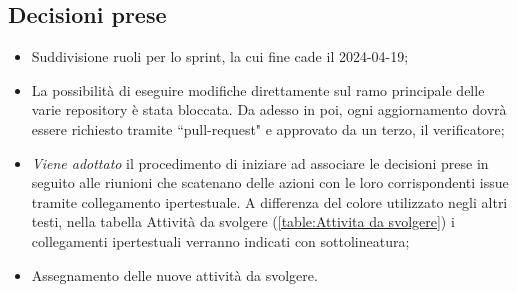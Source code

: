 \documentclass[8pt]{article}
\begin{document}
\subsection{Decisioni prese}
\begin{itemize}
	\setlength\itemsep{0em}
	\item Suddivisione ruoli per lo sprint, la cui fine cade il 2024-04-19;
    \item La possibilità di eseguire modifiche direttamente sul ramo principale delle varie repository è stata bloccata. Da adesso in poi, ogni aggiornamento dovrà essere richiesto tramite ``pull-request" e approvato da un terzo, il verificatore;
    \item \textit{Viene adottato} il procedimento di iniziare ad associare le decisioni prese in seguito alle riunioni che scatenano delle azioni con le loro corrispondenti issue tramite collegamento ipertestuale. A differenza del colore utilizzato negli altri testi, nella tabella Attività da svolgere (\ref{table:Attivita da svolgere}) i collegamenti ipertestuali verranno indicati con sottolineatura;
	\item Assegnamento delle nuove attività da svolgere.
\end{itemize}
\newpage
\end{document}
